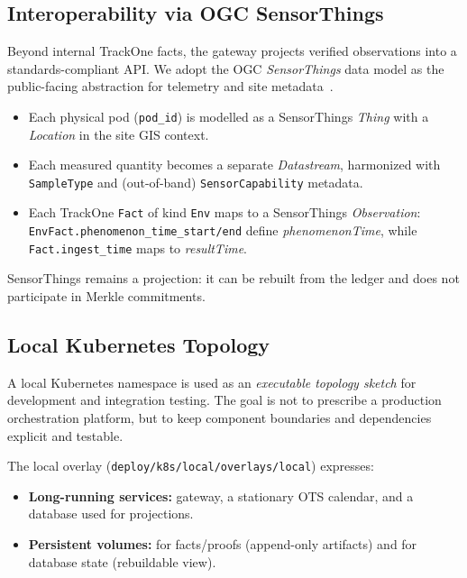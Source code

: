 \subsection{Interoperability via OGC SensorThings}\label{subsec:interoperability-via-ogc-sensorthings}
Beyond internal TrackOne facts, the gateway projects verified observations into a standards-compliant \ac{API}.
We adopt the \ac{OGC} \emph{SensorThings} data model as the public-facing abstraction for telemetry and site metadata~\cite{ogc_sensorthings_part1,ogc_sensorthings_part2}.

\begin{itemize}[nosep]
\item Each physical pod (\texttt{pod\_id}) is modelled as a SensorThings \emph{Thing} with a \emph{Location} in the site \ac{GIS} context.
\item Each measured quantity becomes a separate \emph{Datastream}, harmonized with \texttt{SampleType} and (out-of-band) \texttt{SensorCapability} metadata.
\item Each TrackOne \texttt{Fact} of kind \texttt{Env} maps to a SensorThings \emph{Observation}: \texttt{EnvFact.phenomenon\_time\_start/end} define \emph{phenomenonTime}, while \texttt{Fact.ingest\_time} maps to \emph{resultTime}.
\end{itemize}

SensorThings remains a projection: it can be rebuilt from the ledger and does not participate in Merkle commitments.

\subsection{Local Kubernetes Topology}
\label{subsec:k8s-topology}

A local Kubernetes namespace is used as an \emph{executable topology sketch} for development and integration testing.
The goal is not to prescribe a production orchestration platform, but to keep component boundaries and dependencies explicit and testable.

The local overlay (\texttt{deploy/k8s/local/overlays/local}) expresses:
\begin{itemize}[nosep]
\item \textbf{Long-running services:} gateway, a stationary \ac{OTS} calendar, and a database used for projections.
\item \textbf{Persistent volumes:} for facts/proofs (append-only artifacts) and for database state (rebuildable view).
\end{itemize}

